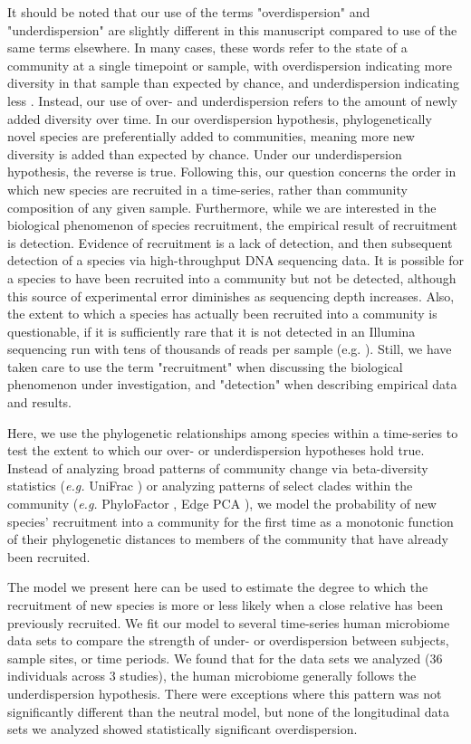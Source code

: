 \documentclass{article}
\begin{document}
It should be noted that our use of the terms "overdispersion" and "underdispersion" are slightly different in this manuscript compared to use of the same terms elsewhere. In many cases, these words refer to the state of a community at a single timepoint or sample, with overdispersion indicating more diversity in that sample than expected by chance, and underdispersion indicating less \cite{Webb2002}. Instead, our use of over- and underdispersion refers to the amount of newly added diversity over time. In our overdispersion hypothesis, phylogenetically novel species are preferentially added to communities, meaning more new diversity is added than expected by chance. Under our underdispersion hypothesis, the reverse is true. Following this, our question concerns the order in which new species are recruited in a time-series, rather than community composition of any given sample. Furthermore, while we are interested in the biological phenomenon of species recruitment, the empirical result of recruitment is detection. Evidence of recruitment is a lack of detection, and then subsequent detection of a species via high-throughput DNA sequencing data. It is possible for a species to have been recruited into a community but not be detected, although this source of experimental error diminishes as sequencing depth increases. Also, the extent to which a species has actually been recruited into a community is questionable, if it is sufficiently rare that it is not detected in an Illumina sequencing run with tens of thousands of reads per sample (e.g. \cite{Yassour2016}). Still, we have taken care to use the term "recruitment" when discussing the biological phenomenon under investigation, and "detection" when describing empirical data and results. 
\par
Here, we use the phylogenetic relationships among species within a time-series to test the extent to which our over- or underdispersion hypotheses hold true. Instead of analyzing broad patterns of community change via beta-diversity statistics (\emph{e.g.} UniFrac \cite{Lozupone2005}) or analyzing patterns of select clades within the community (\emph{e.g.} PhyloFactor \cite{Washburne2017}, Edge PCA \cite{Matsen2013}), we model the probability of new species' recruitment into a community for the first time as a monotonic function of their phylogenetic distances to members of the community that have already been recruited. 
\par
The model we present here can be used to estimate the degree to which the recruitment of new species is more or less likely when a close relative has been previously recruited. We fit our model to several time-series human microbiome data sets \cite{Caporaso2011,Koenig2011,Yassour2016} to compare the strength of under- or overdispersion between subjects, sample sites, or time periods. We found that for the data sets we analyzed (36 individuals across 3 studies), the human microbiome generally follows the underdispersion hypothesis. There were exceptions where this pattern was not significantly different than the neutral model, but none of the longitudinal data sets we analyzed showed statistically significant overdispersion. 
\\\par
\end{document}
